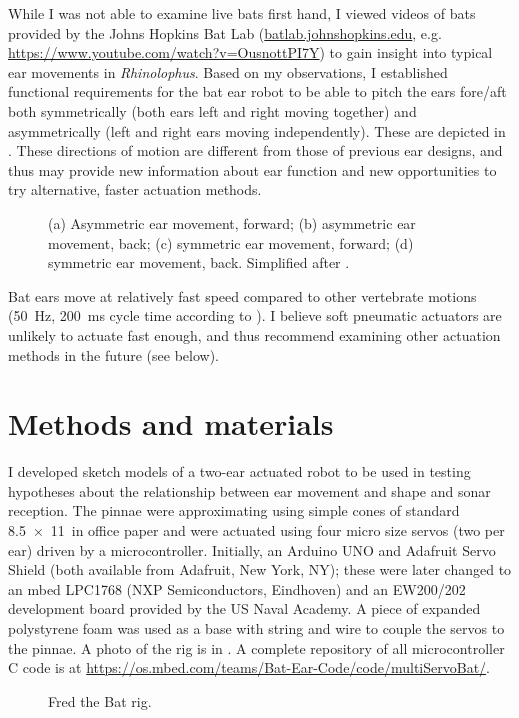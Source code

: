 \documentclass{article}
\begin{document}
While I was not able to examine live bats first hand, I viewed videos of bats provided by the Johns Hopkins Bat Lab (\url{batlab.johnshopkins.edu}, e.g. \url{https://www.youtube.com/watch?v=OusnottPI7Y}) to gain insight into typical ear movements in \emph{Rhinolophus}. Based on my observations, I established functional requirements for the bat ear robot to be able to pitch the ears fore/aft both symmetrically (both ears left and right moving together) and asymmetrically (left and right ears moving independently). These are depicted in . These directions of motion are different from those of previous ear designs, and thus may provide new information about ear function and new opportunities to try alternative, faster actuation methods. 
\begin{figure}[h]
\begin{center}

\end{center}
\caption{(a) Asymmetric ear movement, forward; (b) asymmetric ear movement, back; (c) symmetric ear movement, forward; (d) symmetric ear movement, back. Simplified after \citep{pannala2013investigation}.}
\label{fig:2}
\end{figure}

Bat ears move at relatively fast speed compared to other vertebrate motions (\SI{50}{\hertz}, \SI{200}{\milli\second} cycle time according to \cite{pannala2013interplay}). I believe soft pneumatic actuators are unlikely to actuate fast enough, and thus recommend examining other actuation methods \citep{hines2017soft} in the future (see below). 





\section{Methods and materials}
I developed sketch models of a two-ear actuated robot to be used in testing hypotheses about the relationship between ear movement and shape and sonar reception. The pinnae were approximating using simple cones of standard \SI{8.5x11}{in} office paper and were actuated using four micro size servos (two per ear) driven by a microcontroller. Initially, an Arduino UNO and Adafruit Servo Shield (both available from Adafruit, New York, NY); these were later changed to an mbed LPC1768 (NXP Semiconductors, Eindhoven) and an EW200/202 development board provided by the US Naval Academy. A piece of expanded polystyrene foam was used as a base with string and wire to couple the servos to the pinnae. A photo of the rig is in . A complete repository of all microcontroller C code is at \url{https://os.mbed.com/teams/Bat-Ear-Code/code/multiServoBat/}. 
\begin{figure}[h]
\begin{center}

\end{center}
\caption{Fred the Bat rig.}
\label{fig:3}
\end{figure}
\end{document}
